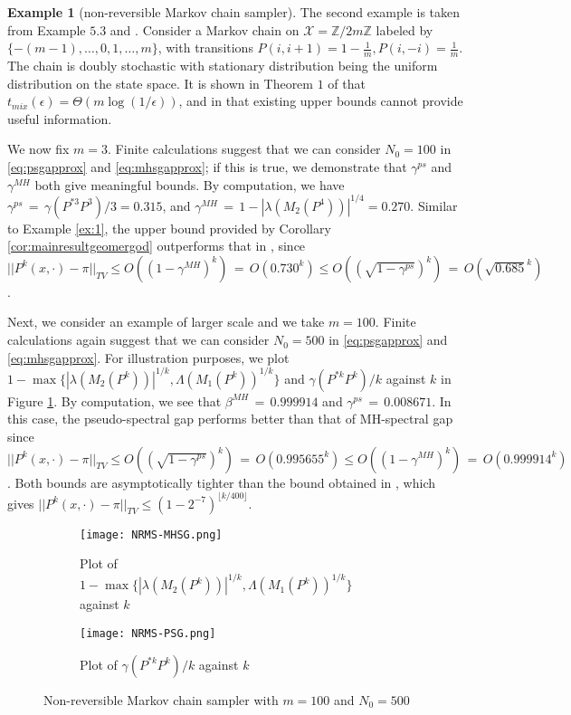 \documentclass[12pt,a4]{amsart}
\numberwithin{equation}{section}
\theoremstyle{plain}
\theoremstyle{definition}
\newtheorem{example}{Example}[section]
\theoremstyle{remark}
\newcommand{\1}{\mathds{1}}
\renewcommand{\leq}{\leqslant}
\begin{document}
\begin{example}[non-reversible Markov chain sampler]\label{ex:2}
	The second example is taken from \cite{MT06} Example $5.3$ and \cite{DHN00}. Consider a Markov chain on $\mathcal{X} = \mathbb{Z}/2m\mathbb{Z}$ labeled by $\{-(m-1),\ldots,0,1,\ldots,m\}$, with transitions $P(i,i+1) = 1 - \frac{1}{m}, P(i,-i) = \frac{1}{m}$. The chain is doubly stochastic with stationary distribution being the uniform distribution on the state space. It is shown in Theorem $1$ of \cite{DHN00} that $t_{mix}(\epsilon) = \Theta(m \log (1/\epsilon))$, and in \cite{MT06} that existing upper bounds cannot provide useful information.
	
	We now fix $m = 3$. Finite calculations suggest that we can consider $N_0 = 100$ in \eqref{eq:psgapprox} and \eqref{eq:mhsgapprox}; if this is true, we demonstrate that $\gamma^{ps}$ and $\gamma^{MH}$ both give meaningful bounds. By computation, we have $\gamma^{ps} {\, = \,} \gamma(P^{*3}P^3)/3 = 0.315$, and $\gamma^{MH} {\, = \,} 1-|\lambda(M_2(P^4))|^{1/4} = 0.270$. Similar to Example \ref{ex:1}, the upper bound provided by Corollary \ref{cor:mainresultgeomergod} outperforms that in \cite{Paulin15}, since $||P^k(x,\cdot) - \pi||_{TV} \leq O((1-\gamma^{MH})^k) {\, = \,} O(0.730^k) \leq O((\sqrt{1-\gamma^{ps}})^k) {\, = \,} O(\sqrt{0.685}^k)$.
	
	Next, we consider an example of larger scale and we take $m = 100$. Finite calculations again suggest that we can consider $N_0 = 500$ in \eqref{eq:psgapprox} and \eqref{eq:mhsgapprox}. For illustration purposes, we plot $1-\max \{ |\lambda(M_2(P^k))|^{1/k}, \Lambda(M_1(P^k))^{1/k} \}$ and $\gamma(P^{*k}P^k)/k$ against $k$ in Figure \ref{fig:NRMS}. By computation, we see that $\beta^{MH} {\, = \,} 0.999914$ and $\gamma^{ps} {\, = \,} 0.008671$. In this case, the pseudo-spectral gap performs better than that of MH-spectral gap since
	$||P^k(x,\cdot) - \pi||_{TV} \leq O((\sqrt{1-\gamma^{ps}})^k) {\, = \,} O(0.995655^k) \leq O((1-\gamma^{MH})^k) {\, = \,} O(0.999914^k)$. Both bounds are asymptotically tighter than the bound obtained in \cite[Theorem $1$]{DHN00}, which gives $||P^k(x,\cdot) - \pi||_{TV} \leq (1-2^{-7})^{\lfloor k/400 \rfloor}$.
\end{example}

\begin{figure}[H]
	\centering
	\begin{subfigure}{0.5\textwidth}
		\centering
		\texttt{[image: NRMS-MHSG.png]}
		\caption{Plot of $1-\max \{ |\lambda(M_2(P^k))|^{1/k}, \Lambda(M_1(P^k))^{1/k} \}$ against $k$}
	\end{subfigure}%
	\begin{subfigure}{0.5\textwidth}
		\centering
		\texttt{[image: NRMS-PSG.png]}
		\caption{Plot of $\gamma(P^{*k}P^k)/k$ against $k$}
	\end{subfigure}
	\caption{Non-reversible Markov chain sampler with $m = 100$ and $N_0 = 500$}
	\label{fig:NRMS}
\end{figure}
\end{document}
